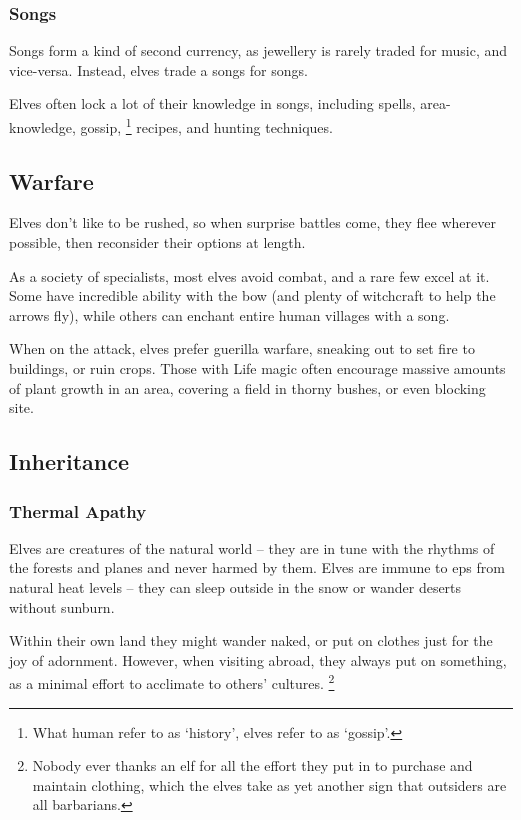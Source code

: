 \begin{multicols}{2}
\subsubsection{Songs}

Songs form a kind of second currency, as jewellery is rarely traded for music, and vice-versa.
Instead, elves trade a songs for songs.

Elves often lock a lot of their knowledge in songs, including spells, \gls{area}-knowledge, gossip,%
\footnote{What human refer to as `history', elves refer to as `gossip'.}
recipes, and hunting techniques.

\subsection{Warfare}

Elves don't like to be rushed, so when surprise battles come, they flee wherever possible, then reconsider their options at length.

As a society of specialists, most elves avoid combat, and a rare few excel at it.
Some have incredible ability with the bow (and plenty of witchcraft to help the arrows fly), while others can enchant entire human \glspl{village} with a song.

When on the attack, elves prefer guerilla warfare, sneaking out to set fire to buildings, or ruin crops.
Those with Life magic often encourage massive amounts of plant growth in an area, covering a field in thorny bushes, or even blocking site.

\subsection{Inheritance}

\subsubsection[Thermal Apathy: take no penalties from natural weather.]{Thermal Apathy}
\label{elvenInheritance}

Elves are creatures of the natural world -- they are in tune with the rhythms of the forests and planes and never harmed by them.
Elves are immune to \glspl{ep} from natural heat levels -- they can sleep outside in the snow or wander deserts without sunburn.

Within their own land they might wander naked, or put on clothes just for the joy of adornment.
However, when visiting abroad, they always put on something, as a minimal effort to acclimate to others' cultures.%
\footnote{Nobody ever thanks an elf for all the effort they put in to purchase and maintain clothing, which the elves take as yet another sign that outsiders are all barbarians.}


\end{multicols}
